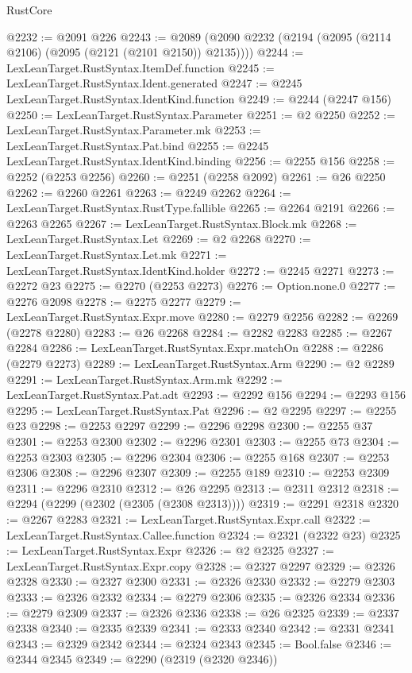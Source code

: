 \begin{lexlean}{RustCore}
\begin{coremodule}
@2232 := @2091 @226
@2243 := @2089 (@2090 @2232 (@2194 (@2095 (@2114 @2106) (@2095 (@2121 (@2101 @2150)) @2135))))
@2244 := LexLeanTarget.RustSyntax.ItemDef.function
@2245 := LexLeanTarget.RustSyntax.Ident.generated
@2247 := @2245 LexLeanTarget.RustSyntax.IdentKind.function
@2249 := @2244 (@2247 @156)
@2250 := LexLeanTarget.RustSyntax.Parameter
@2251 := @2 @2250
@2252 := LexLeanTarget.RustSyntax.Parameter.mk
@2253 := LexLeanTarget.RustSyntax.Pat.bind
@2255 := @2245 LexLeanTarget.RustSyntax.IdentKind.binding
@2256 := @2255 @156
@2258 := @2252 (@2253 @2256)
@2260 := @2251 (@2258 @2092)
@2261 := @26 @2250
@2262 := @2260 @2261
@2263 := @2249 @2262
@2264 := LexLeanTarget.RustSyntax.RustType.fallible
@2265 := @2264 @2191
@2266 := @2263 @2265
@2267 := LexLeanTarget.RustSyntax.Block.mk
@2268 := LexLeanTarget.RustSyntax.Let
@2269 := @2 @2268
@2270 := LexLeanTarget.RustSyntax.Let.mk
@2271 := LexLeanTarget.RustSyntax.IdentKind.holder
@2272 := @2245 @2271
@2273 := @2272 @23
@2275 := @2270 (@2253 @2273)
@2276 := Option.none.{0}
@2277 := @2276 @2098
@2278 := @2275 @2277
@2279 := LexLeanTarget.RustSyntax.Expr.move
@2280 := @2279 @2256
@2282 := @2269 (@2278 @2280)
@2283 := @26 @2268
@2284 := @2282 @2283
@2285 := @2267 @2284
@2286 := LexLeanTarget.RustSyntax.Expr.matchOn
@2288 := @2286 (@2279 @2273)
@2289 := LexLeanTarget.RustSyntax.Arm
@2290 := @2 @2289
@2291 := LexLeanTarget.RustSyntax.Arm.mk
@2292 := LexLeanTarget.RustSyntax.Pat.adt
@2293 := @2292 @156
@2294 := @2293 @156
@2295 := LexLeanTarget.RustSyntax.Pat
@2296 := @2 @2295
@2297 := @2255 @23
@2298 := @2253 @2297
@2299 := @2296 @2298
@2300 := @2255 @37
@2301 := @2253 @2300
@2302 := @2296 @2301
@2303 := @2255 @73
@2304 := @2253 @2303
@2305 := @2296 @2304
@2306 := @2255 @168
@2307 := @2253 @2306
@2308 := @2296 @2307
@2309 := @2255 @189
@2310 := @2253 @2309
@2311 := @2296 @2310
@2312 := @26 @2295
@2313 := @2311 @2312
@2318 := @2294 (@2299 (@2302 (@2305 (@2308 @2313))))
@2319 := @2291 @2318
@2320 := @2267 @2283
@2321 := LexLeanTarget.RustSyntax.Expr.call
@2322 := LexLeanTarget.RustSyntax.Callee.function
@2324 := @2321 (@2322 @23)
@2325 := LexLeanTarget.RustSyntax.Expr
@2326 := @2 @2325
@2327 := LexLeanTarget.RustSyntax.Expr.copy
@2328 := @2327 @2297
@2329 := @2326 @2328
@2330 := @2327 @2300
@2331 := @2326 @2330
@2332 := @2279 @2303
@2333 := @2326 @2332
@2334 := @2279 @2306
@2335 := @2326 @2334
@2336 := @2279 @2309
@2337 := @2326 @2336
@2338 := @26 @2325
@2339 := @2337 @2338
@2340 := @2335 @2339
@2341 := @2333 @2340
@2342 := @2331 @2341
@2343 := @2329 @2342
@2344 := @2324 @2343
@2345 := Bool.false
@2346 := @2344 @2345
@2349 := @2290 (@2319 (@2320 @2346))

\end{coremodule}
\end{lexlean}
